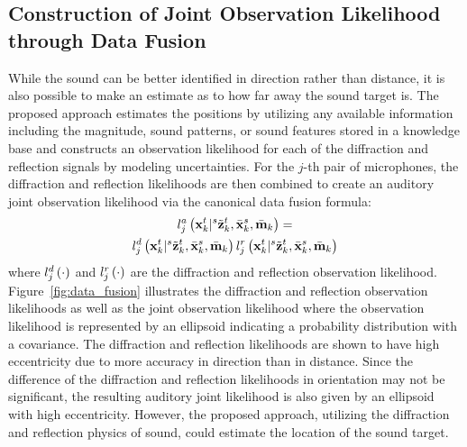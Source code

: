 \documentclass[letterpaper, 10 pt, conference]{ieeeconf}  %
\begin{document}
\subsection{ Construction of Joint Observation Likelihood through Data Fusion} 
While the sound can be better identified in direction rather than distance, it is also possible to make an estimate as to how far away the sound target is.  The proposed approach estimates  the positions by utilizing any available information including the magnitude, sound patterns, or sound features stored in a knowledge base and constructs an observation likelihood for each of the diffraction and reflection signals by modeling uncertainties.  For the $j$-th pair of microphones, the diffraction and reflection likelihoods are then combined to create an auditory joint observation likelihood via the canonical data fusion formula: 
\begin{multline}\label{eq:joint_auditory}
l_j^{a} \left ( \mathbf{x}_{k}^{t}|{}^{s}\tilde {\mathbf{z}}_{k}^{t},\bar {\mathbf{x}}_{k}^{s},\bar {\mathbf{m}}_{k} \right ) = \\ l_j^{d} \left ( \mathbf{x}_{k}^{t}|{}^{s}\tilde {\mathbf{z}}_{k}^{t},\bar {\mathbf{x}}_{k}^{s},\bar {\mathbf{m}}_{k} \right ) l_j^{r} \left ( \mathbf{x}_{k}^{t}|{}^{s}\tilde {\mathbf{z}}_{k}^{t},\bar {\mathbf{x}}_{k}^{s},\bar {\mathbf{m}}_{k} \right ) 
\end{multline}
where $l_j^{d} \left ( \cdot \right )$ and $l_j^{r} \left ( \cdot \right )$ are the diffraction and reflection observation likelihood.  
Figure~\ref{fig:data_fusion} illustrates the diffraction and reflection observation likelihoods as well as the joint observation likelihood where the observation likelihood is represented by an ellipsoid indicating a probability distribution with a covariance.  The diffraction and reflection likelihoods are shown to have high eccentricity due to more accuracy in direction than in distance.  Since the difference of the diffraction and reflection likelihoods in orientation may not be significant, the resulting auditory joint likelihood is also given by an ellipsoid with high eccentricity. However, the proposed approach, utilizing the diffraction and reflection physics of sound, could estimate the location of the sound target.  


\end{document}
